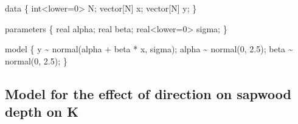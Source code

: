 \documentclass[
  12pt,
  letterpaper,
  DIV=11,
  numbers=noendperiod]{scrartcl}
\newenvironment{Shaded}{\begin{snugshade}}{\end{snugshade}}
\newcommand{\DataTypeTok}[1]{\textcolor[rgb]{0.68,0.00,0.00}{#1}}
\newcommand{\DecValTok}[1]{\textcolor[rgb]{0.68,0.00,0.00}{#1}}
\newcommand{\FloatTok}[1]{\textcolor[rgb]{0.68,0.00,0.00}{#1}}
\newcommand{\KeywordTok}[1]{\textcolor[rgb]{0.00,0.23,0.31}{#1}}
\newcommand{\NormalTok}[1]{\textcolor[rgb]{0.00,0.23,0.31}{#1}}
\begin{document}
\begin{Shaded}
\begin{Highlighting}[]
\KeywordTok{data}\NormalTok{ \{}
  \DataTypeTok{int}\NormalTok{\textless{}}\KeywordTok{lower}\NormalTok{=}\DecValTok{0}\NormalTok{\textgreater{} N;}
  \DataTypeTok{vector}\NormalTok{[N] x;}
  \DataTypeTok{vector}\NormalTok{[N] y;}
\NormalTok{\}}

\KeywordTok{parameters}\NormalTok{ \{}
  \DataTypeTok{real}\NormalTok{ alpha;}
  \DataTypeTok{real}\NormalTok{ beta;}
  \DataTypeTok{real}\NormalTok{\textless{}}\KeywordTok{lower}\NormalTok{=}\DecValTok{0}\NormalTok{\textgreater{} sigma;}
\NormalTok{\}}

\KeywordTok{model}\NormalTok{ \{}
\NormalTok{  y \textasciitilde{} normal(alpha + beta * x, sigma);}
\NormalTok{  alpha \textasciitilde{} normal(}\DecValTok{0}\NormalTok{, }\FloatTok{2.5}\NormalTok{);}
\NormalTok{  beta \textasciitilde{} normal(}\DecValTok{0}\NormalTok{, }\FloatTok{2.5}\NormalTok{);}
\NormalTok{\}}
\end{Highlighting}
\end{Shaded}

\newpage

\subsection{Model for the effect of direction on sapwood depth on
K}\label{model-for-the-effect-of-direction-on-sapwood-depth-on-k}
\end{document}

